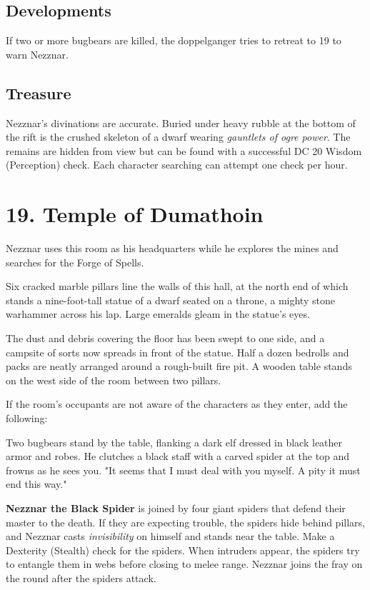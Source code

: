 \documentclass[10pt,a4paper,twoside,bg=print,twocolumn,openany,nodeprecatedcode]{dndbook}
\begin{document}
\subsection{Developments}
If two or more bugbears are killed, the doppelganger tries to retreat to 19 to warn Nezznar.

\subsection{Treasure}
Nezznar's divinations are accurate. Buried under heavy rubble at the bottom of the rift is the crushed skeleton of a dwarf wearing \textit{gauntlets of ogre power}. The remains are hidden from view but can be found with a successful DC 20 Wisdom (Perception) check. Each character searching can attempt one check per hour.

\section{19. Temple of Dumathoin}
Nezznar uses this room as his headquarters while he explores the mines and searches for the Forge of Spells.

\begin{DndReadAloud}{}
Six cracked marble pillars line the walls of this hall, at the north end of which stands a nine-foot-tall statue of a dwarf seated on a throne, a mighty stone warhammer across his lap. Large emeralds gleam in the statue's eyes.

The dust and debris covering the floor has been swept to one side, and a campsite of sorts now spreads in front of the statue. Half a dozen bedrolls and packs are neatly arranged around a rough-built fire pit. A wooden table stands on the west side of the room between two pillars.

\end{DndReadAloud}

If the room's occupants are not aware of the characters as they enter, add the following:

\begin{DndReadAloud}{}
Two bugbears stand by the table, flanking a dark elf dressed in black leather armor and robes. He clutches a black staff with a carved spider at the top and frowns as he sees you. "It seems that I must deal with you myself. A pity it must end this way."

\end{DndReadAloud}

\textbf{Nezznar the Black Spider} is joined by four giant spiders that defend their master to the death. If they are expecting trouble, the spiders hide behind pillars, and Nezznar casts \textit{invisibility} on himself and stands near the table. Make a Dexterity (Stealth) check for the spiders. When intruders appear, the spiders try to entangle them in webs before closing to melee range. Nezznar joins the fray on the round after the spiders attack.
\end{document}
